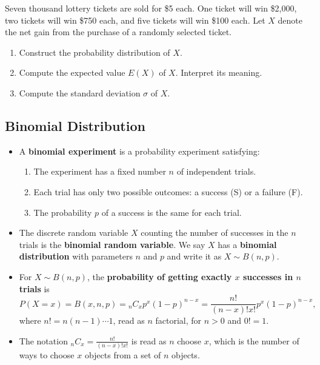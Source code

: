 \begin{exercise}

Seven thousand lottery tickets are sold for \$5 each. One ticket will
win \$2,000, two tickets will win \$750 each, and five tickets will win
\$100 each. Let \(X\) denote the net gain from the purchase of a
randomly selected ticket.

\begin{enumerate}
\item
  Construct the probability distribution of \(X\).
\item
  Compute the expected value \(E(X)\) of \(X\). Interpret its meaning.
\item
  Compute the standard deviation \(\sigma\) of \(X\).
\end{enumerate}

\end{exercise}

\hypertarget{binomial-distribution}{%
\subsection{Binomial Distribution}\label{binomial-distribution}}

\begin{itemize}
\item
  A \textbf{binomial experiment} is a probability experiment satisfying:

  \begin{enumerate}
  \item
    The experiment has a fixed number \(n\) of independent trials.
  \item
    Each trial has only two possible outcomes: a success (S) or a
    failure (F).
  \item
    The probability \(p\) of a success is the same for each trial.
  \end{enumerate}
\item
  The discrete random variable \(X\) counting the number of successes in
  the \(n\) trials is the \textbf{binomial random variable}. We say
  \(X\) has a \textbf{binomial distribution} with parameters \(n\) and
  \(p\) and write it as \(X\sim B(n, p)\).
\item
  For \(X\sim B(n, p)\), the \textbf{probability of getting exactly
  \(x\) successes in \(n\) trials} is
  \[P(X=x)=B(x,n,p)={_n C_x} p^x(1-p)^{n-x}=\frac{n!}{(n-x)!x!}p^x(1-p)^{n-x},\]
  where \(n!=n(n-1)\cdots 1\), read as \(n\) factorial, for \(n>0\) and
  \(0!=1.\)
\item
  The notation \({_n C_x}=\frac{n!}{(n-x)!x!}\) is read as \(n\) choose
  \(x\), which is the number of ways to choose \(x\) objects from a set
  of \(n\) objects.
\end{itemize}

